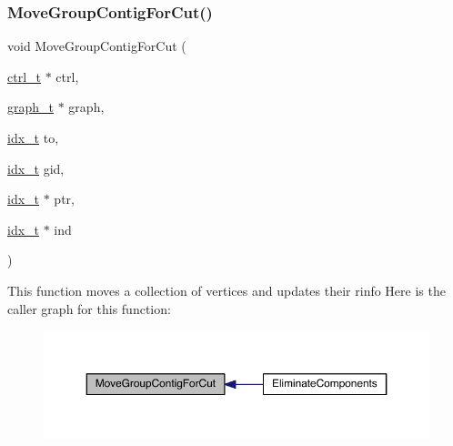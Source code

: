 \subsubsection{\texorpdfstring{Move\+Group\+Contig\+For\+Cut()}{MoveGroupContigForCut()}}
{\footnotesize\ttfamily void Move\+Group\+Contig\+For\+Cut (\begin{DoxyParamCaption}\item[{\hyperlink{a00742}{ctrl\+\_\+t} $\ast$}]{ctrl,  }\item[{\hyperlink{a00734}{graph\+\_\+t} $\ast$}]{graph,  }\item[{\hyperlink{a00876_aaa5262be3e700770163401acb0150f52}{idx\+\_\+t}}]{to,  }\item[{\hyperlink{a00876_aaa5262be3e700770163401acb0150f52}{idx\+\_\+t}}]{gid,  }\item[{\hyperlink{a00876_aaa5262be3e700770163401acb0150f52}{idx\+\_\+t} $\ast$}]{ptr,  }\item[{\hyperlink{a00876_aaa5262be3e700770163401acb0150f52}{idx\+\_\+t} $\ast$}]{ind }\end{DoxyParamCaption})}

This function moves a collection of vertices and updates their rinfo Here is the caller graph for this function\+:\nopagebreak
\begin{figure}[H]
\begin{center}
\leavevmode
\includegraphics[width=350pt]{a00188_a59be93c110982dd4b4e918957804e3b7_icgraph}
\end{center}
\end{figure}
\mbox{\label{a00188_ac9671fbb0e67a5e8bee0d578ebcd0382}} 
